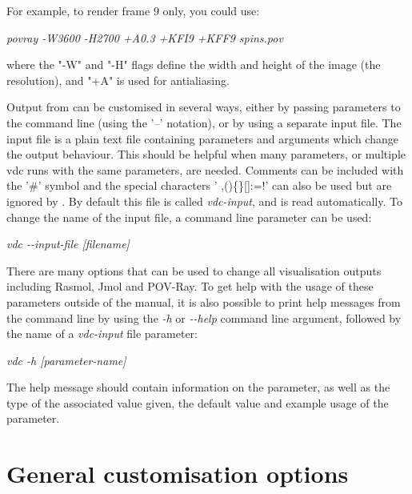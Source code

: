 For example, to render frame 9 only, you could use:

\noindent
\begin{minipage}[c]{\textwidth}
\centering
\textit{povray -W3600 -H2700 +A0.3 +KFI9 +KFF9 spins.pov}
\end{minipage}

\noindent where the "-W" and "-H" flags define the width and height of the image
(the resolution), and "+A" is used for antialiasing.

Output from \vdc can be customised in several ways, either by passing parameters
to the command line (using the '\textit{--}' notation), or by using a separate
\vdc input file. The \vdc input file is a plain text file containing parameters
and arguments which change the output behaviour. This should be helpful when
many parameters, or multiple vdc runs with the same parameters, are needed.
Comments can be included with the '\#' symbol and the special characters
' ,()\{\}[]:=!' can also be used but are ignored by \vdc.  By default this file
is called \textit{vdc-input}, and is read automatically. To change the name of
the \vdc input file, a command line parameter can be used:

\noindent
\begin{minipage}[c]{\textwidth}
\centering
\textit{vdc -{}-input-file [filename]}
\end{minipage}

There are many options that can be used to change all visualisation outputs
including Rasmol, Jmol and POV-Ray. To get help with the usage of these
parameters outside of the manual, it is also possible to print help messages
from the command line by using the \textit{-h} or \textit{-{}-help} command line
argument, followed by the name of a \textit{vdc-input} file parameter:

\noindent
\begin{minipage}[c]{\textwidth}
\centering
\textit{vdc -h [parameter-name]}
\end{minipage}

The help message should contain information on the parameter, as well as the
type of the associated value given, the default value and example usage of the
parameter.

\section*{General customisation options}

